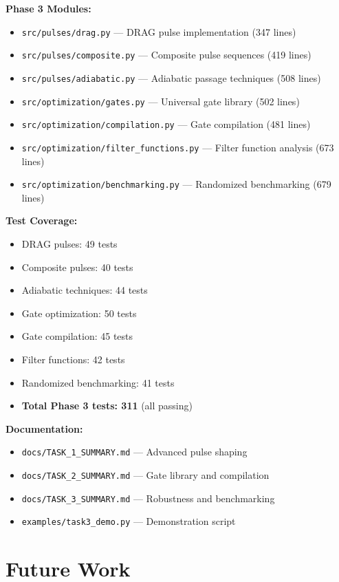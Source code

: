 \documentclass[11pt,a4paper]{article}
\theoremstyle{definition}
\theoremstyle{remark}
\begin{document}
\textbf{Phase 3 Modules:}
\begin{itemize}
    \item \texttt{src/pulses/drag.py} — DRAG pulse implementation (347 lines)
    \item \texttt{src/pulses/composite.py} — Composite pulse sequences (419 lines)
    \item \texttt{src/pulses/adiabatic.py} — Adiabatic passage techniques (508 lines)
    \item \texttt{src/optimization/gates.py} — Universal gate library (502 lines)
    \item \texttt{src/optimization/compilation.py} — Gate compilation (481 lines)
    \item \texttt{src/optimization/filter\_functions.py} — Filter function analysis (673 lines)
    \item \texttt{src/optimization/benchmarking.py} — Randomized benchmarking (679 lines)
\end{itemize}

\textbf{Test Coverage:}
\begin{itemize}
    \item DRAG pulses: 49 tests
    \item Composite pulses: 40 tests
    \item Adiabatic techniques: 44 tests
    \item Gate optimization: 50 tests
    \item Gate compilation: 45 tests
    \item Filter functions: 42 tests
    \item Randomized benchmarking: 41 tests
    \item \textbf{Total Phase 3 tests: 311} (all passing)
\end{itemize}

\textbf{Documentation:}
\begin{itemize}
    \item \texttt{docs/TASK\_1\_SUMMARY.md} — Advanced pulse shaping
    \item \texttt{docs/TASK\_2\_SUMMARY.md} — Gate library and compilation
    \item \texttt{docs/TASK\_3\_SUMMARY.md} — Robustness and benchmarking
    \item \texttt{examples/task3\_demo.py} — Demonstration script
\end{itemize}

\section{Future Work}
\end{document}
